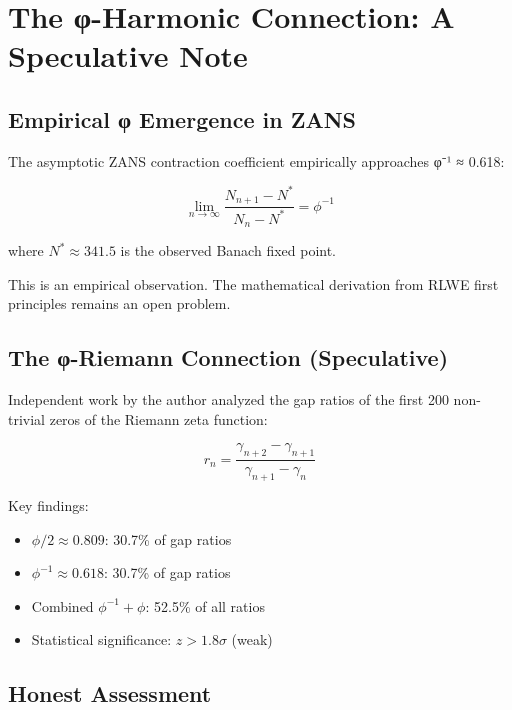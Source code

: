 
\section{The φ-Harmonic Connection: A Speculative Note}

\subsection{Empirical φ Emergence in ZANS}

The asymptotic ZANS contraction coefficient empirically approaches φ⁻¹ ≈ 0.618:

\begin{equation}
\lim_{n\to\infty} \frac{N_{n+1} - N^*}{N_n - N^*} = \phi^{-1}
\end{equation}

where $N^* \approx 341.5$ is the observed Banach fixed point.

This is an empirical observation. The mathematical derivation from RLWE first principles remains an open problem.

\subsection{The φ-Riemann Connection (Speculative)}

Independent work by the author \cite{fernandez2026phi} analyzed the gap ratios of the first 200 non-trivial zeros of the Riemann zeta function:

\begin{equation}
r_n = \frac{\gamma_{n+2} - \gamma_{n+1}}{\gamma_{n+1} - \gamma_n}
\end{equation}

Key findings:
\begin{itemize}
    \item $\phi/2 \approx 0.809$: 30.7\% of gap ratios
    \item $\phi^{-1} \approx 0.618$: 30.7\% of gap ratios
    \item Combined $\phi^{-1} + \phi$: 52.5\% of all ratios
    \item Statistical significance: $z > 1.8\sigma$ (weak)
\end{itemize}

\subsection{Honest Assessment}

